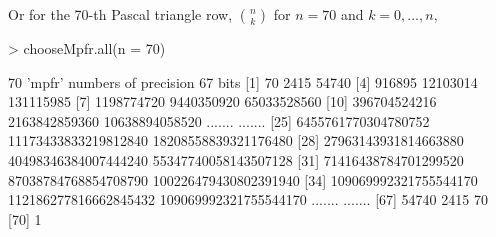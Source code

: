 \begin{frame}[fragile]
Or for the 70-th Pascal triangle row, $\binom{n}{k}$ for $n=70$ and $k=0,\dots,n$,
\begin{Schunk}
\begin{Sinput}
> chooseMpfr.all(n = 70)
\end{Sinput}
\end{Schunk}
\begin{Schunk}
\begin{Soutput}
70 'mpfr' numbers of precision  67   bits 
 [1]                    70                  2415                 54740
 [4]                916895              12103014             131115985
 [7]            1198774720            9440350920           65033528560
[10]          396704524216         2163842859360        10638894058520
 ....... 
 ....... 
[25]   6455761770304780752  11173433833219812840  18208558839321176480
[28]  27963143931814663880  40498346384007444240  55347740058143507128
[31]  71416438784701299520  87038784768854708790 100226479430802391940
[34] 109069992321755544170 112186277816662845432 109069992321755544170
 ....... 
 ....... 
[67]                 54740                  2415                    70
[70]                     1
\end{Soutput}
\end{Schunk}
\end{frame}

